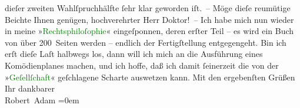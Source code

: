                     dieſer zweiten Wahlſpruchhälfte ſehr klar geworden iſt. –\pend
           \pstart
           Möge dieſe reumütige Beichte Ihnen genügen, hochverehrter Herr Doktor! –\pend
           \pstart
           Ich habe mich nun wieder in meine »\textcolor{green}{Rechtsphiloſophie}{}\ledrightnote{\textcolor{green}{Rechtsphilosophie}}« eingeſponnen, deren erſter Teil – es wird ein Buch
                    von über 200 Seiten werden – endlich der Fertigſtellung entgegengeht. Bin ich
                    erſt dieſe Laſt halbwegs los, dann will ich mich an die Ausführung eines
                    Komödienplanes machen, und ich hoffe, daß ich damit ſeinerzeit die von der »\textcolor{green}{Geſellſchaft}{}\ledrightnote{\textcolor{green}{Gesellschaft [Eine Gaunerkomödie]}}« geſchlagene Scharte auswetzen
                    kann.\pend
           \pstart
           Mit den ergebenſten Grüßen Ihr\pend
           \pstart
           dankbarer{\\[\baselineskip]}\spacefill\mbox{Robert Adam}\pend
           \leftskip=0em{}\endnumbering{}  
      